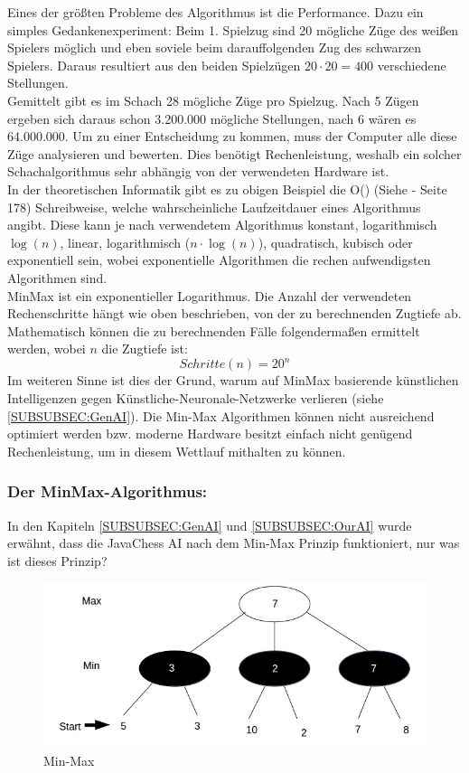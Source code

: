 \documentclass[12pt,a4paper]{article}
\begin{document}
{Eines der größten Probleme des Algorithmus ist die Performance. Dazu ein simples Gedankenexperiment: Beim 1. Spielzug sind 20 mögliche Züge des weißen Spielers möglich und eben soviele beim darauffolgenden Zug des schwarzen Spielers. Daraus resultiert aus den beiden Spielzügen \(20 \cdot 20 = 400\) verschiedene Stellungen. \\
Gemittelt gibt es im Schach 28 mögliche Züge pro Spielzug. Nach 5 Zügen ergeben sich daraus schon 3.200.000 mögliche Stellungen, nach 6 wären es 64.000.000. Um zu einer Entscheidung zu kommen, muss der Computer alle diese Züge analysieren und bewerten. Dies benötigt Rechenleistung, weshalb ein solcher Schachalgorithmus sehr abhängig von der verwendeten Hardware ist. \\[1ex]
In der theoretischen Informatik gibt es zu obigen Beispiel die O() (Siehe \cite{pragmatic} - Seite 178) Schreibweise, welche wahrscheinliche Laufzeitdauer eines Algorithmus angibt. Diese kann je nach verwendetem Algorithmus konstant, logarithmisch $\log(n)$, linear, logarithmisch ($n \cdot \log(n)$), quadratisch, kubisch oder exponentiell sein, wobei exponentielle Algorithmen die rechen aufwendigsten Algorithmen sind. \\
MinMax ist ein exponentieller Logarithmus. Die Anzahl der verwendeten Rechenschritte hängt wie oben beschrieben, von der zu berechnenden Zugtiefe ab. Mathematisch können die zu berechnenden Fälle folgendermaßen ermittelt werden, wobei $n$ die Zugtiefe ist:
\[Schritte(n) = 20^n\]
Im weiteren Sinne ist dies der Grund, warum auf MinMax basierende künstlichen Intelligenzen gegen Künstliche-Neuronale-Netzwerke verlieren (siehe \ref{SUBSUBSEC:GenAI}). Die Min-Max Algorithmen können nicht ausreichend optimiert werden bzw. moderne Hardware besitzt einfach nicht genügend Rechenleistung, um in diesem Wettlauf mithalten zu können. \\

\newpage
\subsubsection{Der MinMax-Algorithmus:}
\label{SUBSUBSEC:MinMax}

In den Kapiteln \ref{SUBSUBSEC:GenAI} und \ref{SUBSUBSEC:OurAI} wurde erwähnt, dass die JavaChess AI nach dem Min-Max Prinzip funktioniert, nur was ist dieses Prinzip?

\begin{figure}[H]
  \centering
   	\includegraphics[width=16cm]{graphics/MinMax.jpg}
  \caption{Min-Max}
  \label{FIG:MINMAX}
\end{figure}


}
\end{document}
